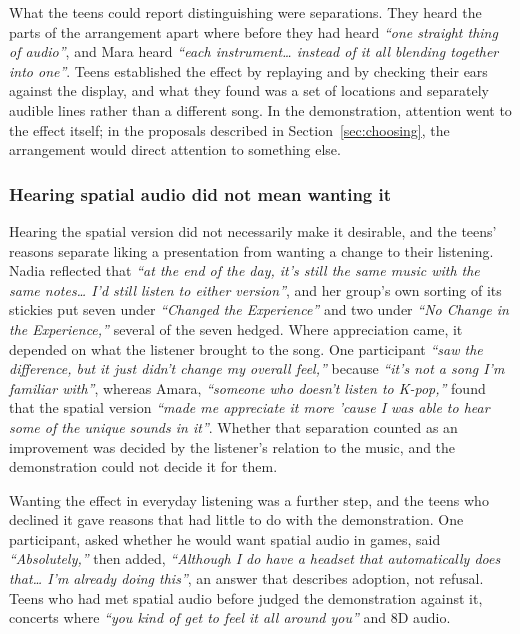 What the teens could report distinguishing were separations. They heard the parts of the arrangement apart where before they had heard \textit{``one straight thing of audio''}, and Mara heard \textit{``each instrument\ldots{} instead of it all blending together into one''}. Teens established the effect by replaying and by checking their ears against the display, and what they found was a set of locations and separately audible lines rather than a different song. In the demonstration, attention went to the effect itself; in the proposals described in Section~\ref{sec:choosing}, the arrangement would direct attention to something else.

\subsubsection{Hearing spatial audio did not mean wanting it}

Hearing the spatial version did not necessarily make it desirable, and the teens' reasons separate liking a presentation from wanting a change to their listening. Nadia reflected that \textit{``at the end of the day, it's still the same music with the same notes\ldots{} I'd still listen to either version''}, and her group's own sorting of its stickies put seven under \textit{``Changed the Experience''} and two under \textit{``No Change in the Experience,''} several of the seven hedged. Where appreciation came, it depended on what the listener brought to the song. One participant \textit{``saw the difference, but it just didn't change my overall feel,''} because \textit{``it's not a song I'm familiar with''}, whereas Amara, \textit{``someone who doesn't listen to K-pop,''} found that the spatial version \textit{``made me appreciate it more 'cause I was able to hear some of the unique sounds in it''}. Whether that separation counted as an improvement was decided by the listener's relation to the music, and the demonstration could not decide it for them.

Wanting the effect in everyday listening was a further step, and the teens who declined it gave reasons that had little to do with the demonstration. One participant, asked whether he would want spatial audio in games, said \textit{``Absolutely,''} then added, \textit{``Although I do have a headset that automatically does that\ldots{} I'm already doing this''}, an answer that describes adoption, not refusal. Teens who had met spatial audio before judged the demonstration against it, concerts where \textit{``you kind of get to feel it all around you''} and 8D audio.

